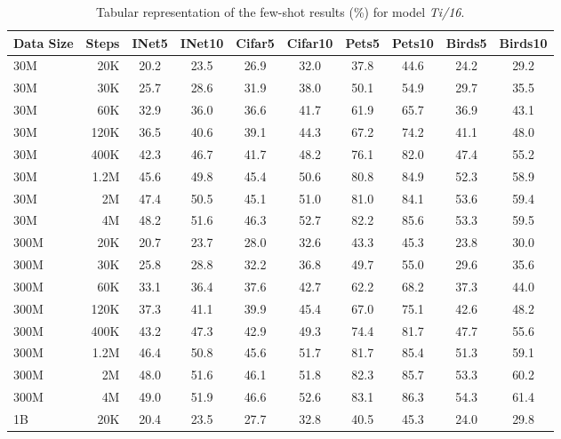 \begin{table}[t]
  \setlength{\tabcolsep}{5pt}
  \setlength{\extrarowheight}{5pt}
  \renewcommand{\arraystretch}{0.75}
  \centering
  \caption{Tabular representation of the few-shot results (\%) for model \emph{Ti/16}.}\label{tbl:ti_16}
  \begin{tabulary}{1.0\textwidth}{l r c c c c c c c c}
    \toprule[1pt]
    \bf{Data Size} & \bf{Steps} & \bf{INet5} & \bf{INet10} & \bf{Cifar5} & \bf{Cifar10} & \bf{Pets5} & \bf{Pets10} & \bf{Birds5} & \bf{Birds10} \\
    \midrule
30M   & 20K   & 20.2 & 23.5 & 26.9 & 32.0 & 37.8 & 44.6 & 24.2 & 29.2 \\
30M   & 30K   & 25.7 & 28.6 & 31.9 & 38.0 & 50.1 & 54.9 & 29.7 & 35.5 \\
30M   & 60K   & 32.9 & 36.0 & 36.6 & 41.7 & 61.9 & 65.7 & 36.9 & 43.1 \\
30M   & 120K  & 36.5 & 40.6 & 39.1 & 44.3 & 67.2 & 74.2 & 41.1 & 48.0 \\
30M   & 400K  & 42.3 & 46.7 & 41.7 & 48.2 & 76.1 & 82.0 & 47.4 & 55.2 \\
30M   & 1.2M    & 45.6 & 49.8 & 45.4 & 50.6 & 80.8 & 84.9 & 52.3 & 58.9 \\
30M   & 2M    & 47.4 & 50.5 & 45.1 & 51.0 & 81.0 & 84.1 & 53.6 & 59.4 \\
30M   & 4M    & 48.2 & 51.6 & 46.3 & 52.7 & 82.2 & 85.6 & 53.3 & 59.5 \\
\midrule[0.25pt]
300M  & 20K   & 20.7 & 23.7 & 28.0 & 32.6 & 43.3 & 45.3 & 23.8 & 30.0 \\
300M  & 30K   & 25.8 & 28.8 & 32.2 & 36.8 & 49.7 & 55.0 & 29.6 & 35.6 \\
300M  & 60K   & 33.1 & 36.4 & 37.6 & 42.7 & 62.2 & 68.2 & 37.3 & 44.0 \\
300M  & 120K  & 37.3 & 41.1 & 39.9 & 45.4 & 67.0 & 75.1 & 42.6 & 48.2 \\
300M  & 400K  & 43.2 & 47.3 & 42.9 & 49.3 & 74.4 & 81.7 & 47.7 & 55.6 \\
300M  & 1.2M    & 46.4 & 50.8 & 45.6 & 51.7 & 81.7 & 85.4 & 51.3 & 59.1 \\
300M  & 2M    & 48.0 & 51.6 & 46.1 & 51.8 & 82.3 & 85.7 & 53.3 & 60.2 \\
300M  & 4M    & 49.0 & 51.9 & 46.6 & 52.6 & 83.1 & 86.3 & 54.3 & 61.4 \\
\midrule[0.25pt]
1B    & 20K   & 20.4 & 23.5 & 27.7 & 32.8 & 40.5 & 45.3 & 24.0 & 29.8 \\

\end{tabulary}
\end{table}

